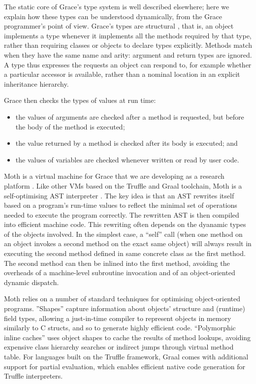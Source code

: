 \documentclass[sigplan,10pt,review,screen]{acmart}\settopmatter{printfolios=true}
\begin{document}
The static core of Grace's type system is well described
elsewhere\citep{TimJonesThesis};
here we explain how
these types can be understood 
dynamically, from the Grace programmer's point of view.
Grace's types are structural \citep{graceOnward12},
that is, an object implements a type whenever it
implements all the methods required by that type,
rather than requiring classes or objects to declare types explicitly.
Methods match when they have the same name and arity:
argument and return types are ignored.
A type thus expresses the requests an object can respond to,
for example whether a particular accessor is available,
rather than a nominal location in an explicit inheritance hierarchy.

Grace then checks the types of values at run time:
%
\begin{itemize}
\item the values of arguments are checked after a method is requested, 
      but before the body of the method is executed;
\item the value returned by a method is checked after its body is executed; and
\item the values of variables are checked
      whenever written or read by user code.
\end{itemize}


Moth is a virtual machine for Grace that we are developing as a
research platform \cite{roberts-and-co-ecoop-2019}. Like other VMs
based on the Truffle and Graal toolchain, Moth is a self-optimising
AST interpreter \cite{Wurthinger:2012:SelfOptAST}. 
The key idea is that an AST rewrites itself based on a program's run-time values
to reflect the minimal set of operations needed to execute the program
correctly. The rewritten AST is then compiled into efficient machine
code. This rewriting often depends on the dyanamic types of the
objects involved. In the simplest case, a ``self'' call (when one method
on an object invokes a second method on the exact same object) will
always result in executing the second method defined in same concrete
class as the first method. The second method can then be inlined into
the first method, avoiding the overheads of a machine-level subroutine
invocation and of an object-oriented dynamic dispatch.


Moth relies on a number of standard techniques for optimising
object-oriented programs.
''Shapes'' \citep{woss2014object} capture information about objects'
structure and (runtime) 
field types, allowing a just-in-time compiler to
represent objects in memory similarly to C structs, and so to 
generate highly efficient code.
``Polymorphic inline caches''
\citep{Hoelzle:91:PIC} uses object shapes to cache the results of
method lookups, avoiding expensive class hierarchy searches or
indirect jumps through virtual method table. 
For languages built on the Truffle framework,
Graal comes with  additional support for partial evaluation,
which enables efficient native code generation for
Truffle interpreters\citep{Wurthinger:2017:PPE}.
\end{document}
